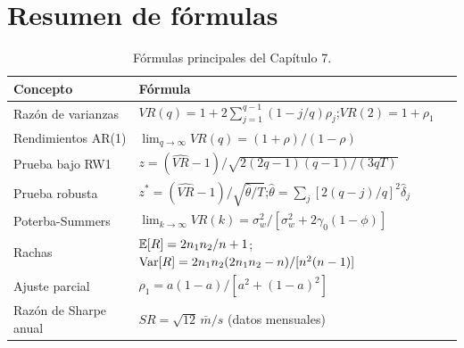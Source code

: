 \section{Resumen de fórmulas}

\begin{table}[H]
\centering\small
\begin{tabular}{@{}ll@{}}
\toprule
Concepto & Fórmula \\
\midrule
Razón de varianzas & $VR(q)=1+2\sum_{j=1}^{q-1}(1-j/q)\rho_j$;\quad $VR(2)=1+\rho_1$ \\
Rendimientos AR(1) & $\lim_{q\to\infty}VR(q)=(1+\rho)/(1-\rho)$ \\
Prueba bajo RW1 & $z=(\widehat{VR}-1)/\sqrt{2(2q-1)(q-1)/(3qT)}$ \\
Prueba robusta & $z^*=(\widehat{VR}-1)/\sqrt{\hat\theta/T}$;\quad $\hat\theta=\sum_j[2(q-j)/q]^2\hat\delta_j$ \\
Poterba-Summers & $\lim_{k\to\infty}VR(k)=\sigma_w^2/[\sigma_w^2+2\gamma_0(1-\phi)]$ \\
Rachas & $\mathbb{E}[R]=2n_1n_2/n+1$;\quad $\operatorname{Var}[R]=2n_1n_2(2n_1n_2-n)/[n^2(n-1)]$ \\
Ajuste parcial & $\rho_1=a(1-a)/[a^2+(1-a)^2]$ \\
Razón de Sharpe anual & $SR=\sqrt{12}\,\bar m/s$ (datos mensuales) \\
\bottomrule
\end{tabular}
\caption{Fórmulas principales del Capítulo 7.}
\end{table}

